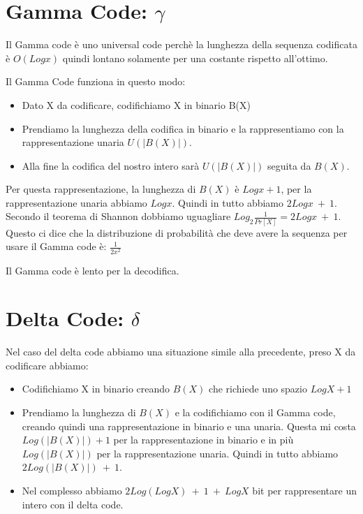 \documentclass[14pt]{extreport}
\begin{document}
\section{Gamma Code: $\gamma$}

Il Gamma code è uno universal code perchè la lunghezza della sequenza codificata è $O(Logx)$ quindi lontano solamente per una costante rispetto all'ottimo.

Il Gamma Code funziona in questo modo:
\begin{itemize}
\item Dato X da codificare, codifichiamo X in binario B(X)
\item Prendiamo la lunghezza della codifica in binario e la rappresentiamo con la rappresentazione unaria $U(|B(X)|)$.
\item Alla fine la codifica del nostro intero sarà $U(|B(X)|)$ seguita da $B(X)$.
\end{itemize}

Per questa rappresentazione, la lunghezza di $B(X)$ è $Logx+1$, per la rappresentazione unaria abbiamo $Logx$. Quindi in tutto abbiamo $2Logx\ +\ 1$.
Secondo il teorema di Shannon dobbiamo uguagliare $Log_2\frac{1}{Pr[X]}=2Logx\ +\ 1$.
Questo ci dice che la distribuzione di probabilità che deve avere la sequenza per usare il Gamma code è: $\frac{1}{2x^2}$

Il Gamma code è lento per la decodifica.

\section{Delta Code: $\delta$}

Nel caso del delta code abbiamo una situazione simile alla precedente, preso X da codificare abbiamo:

\begin{itemize}
\item Codifichiamo X in binario creando $B(X)$ che richiede uno spazio $LogX+1$
\item Prendiamo la lunghezza di $B(X)$ e la codifichiamo con il Gamma code, creando quindi una rappresentazione in binario e una unaria. Questa mi costa $Log(|B(X)|)+1$ per la rappresentazione in binario e in più $Log(|B(X)|)$ per la rappresentazione unaria. Quindi in tutto abbiamo $2Log(|B(X)|)\ +\ 1$.
\item Nel complesso abbiamo $2Log(LogX)\ +\ 1\ +\ LogX$ bit per rappresentare un intero con il delta code.
\end{itemize}
\end{document}
